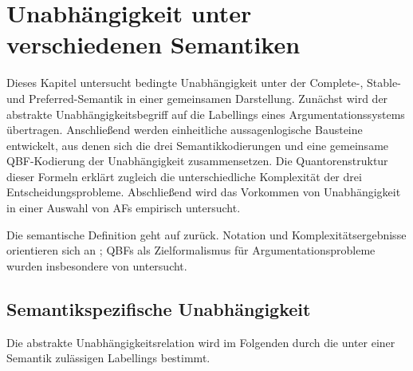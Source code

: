 \chapter{Unabhängigkeit unter verschiedenen Semantiken}
\label{ch:semantic-independence}

Dieses Kapitel untersucht bedingte Unabhängigkeit unter der Complete-,
Stable- und Preferred-Semantik in einer gemeinsamen Darstellung. Zunächst
wird der abstrakte Unabhängigkeitsbegriff auf die Labellings eines
Argumentationssystems übertragen. Anschließend werden einheitliche
aussagenlogische Bausteine entwickelt, aus denen sich die drei
Semantikkodierungen und eine gemeinsame QBF-Kodierung der Unabhängigkeit
zusammensetzen. Die Quantorenstruktur dieser Formeln erklärt zugleich die
unterschiedliche Komplexität der drei Entscheidungsprobleme. Abschließend
wird das Vorkommen von Unabhängigkeit in einer Auswahl von AFs empirisch untersucht.

Die semantische Definition geht auf
\textcite{rienstra:2020:independence-af} zurück. Notation und
Komplexitätsergebnisse orientieren sich an
\textcite{bluemel:2025:independence-aba}; QBFs als Zielformalismus für
Argumentationsprobleme wurden insbesondere von
\textcite{egly:woltran:2006:reasoning-qbf} untersucht.

\section{Semantikspezifische Unabhängigkeit}
\label{sec:sigma-independence-af}

Die abstrakte Unabhängigkeitsrelation wird im Folgenden durch die unter einer
Semantik zulässigen Labellings bestimmt.

